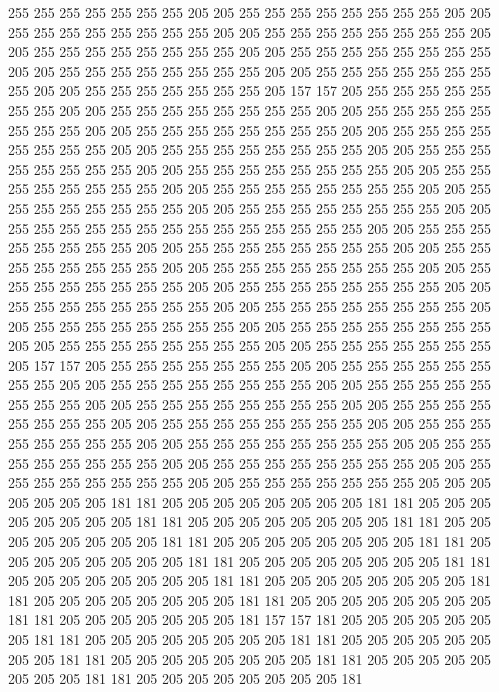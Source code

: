 255 255 255 255 255 255 255 205 205 255 255 255 255 255 255 255 255 205 205 255
255 255 255 255 255 255 255 205 205 255 255 255 255 255 255 255 255 205 205 255
255 255 255 255 255 255 255 205 205 255 255 255 255 255 255 255 255 205 205 255
255 255 255 255 255 255 255 205 205 255 255 255 255 255 255 255 255 205 205 255
255 255 255 255 255 255 205 157 157 205 255 255 255 255 255 255 255 205 205 255
255 255 255 255 255 255 255 205 205 255 255 255 255 255 255 255 255 205 205 255
255 255 255 255 255 255 255 205 205 255 255 255 255 255 255 255 255 205 205 255
255 255 255 255 255 255 255 205 205 255 255 255 255 255 255 255 255 205 205 255
255 255 255 255 255 255 255 205 205 255 255 255 255 255 255 255 255 205 205 255
255 255 255 255 255 255 255 205 205 255 255 255 255 255 255 255 255 205 205 255
255 255 255 255 255 255 255 205 205 255 255 255 255 255 255 255 255 255 255 255
255 255 255 205 205 255 255 255 255 255 255 255 255 205 205 255 255 255 255 255
255 255 255 205 205 255 255 255 255 255 255 255 255 205 205 255 255 255 255 255
255 255 255 205 205 255 255 255 255 255 255 255 255 205 205 255 255 255 255 255
255 255 255 205 205 255 255 255 255 255 255 255 255 205 205 255 255 255 255 255
255 255 255 205 205 255 255 255 255 255 255 255 255 205 205 255 255 255 255 255
255 255 255 205 205 255 255 255 255 255 255 255 255 205 205 255 255 255 255 255
255 255 205 157 157 205 255 255 255 255 255 255 255 205 205 255 255 255 255 255
255 255 255 205 205 255 255 255 255 255 255 255 255 205 205 255 255 255 255 255
255 255 255 205 205 255 255 255 255 255 255 255 255 205 205 255 255 255 255 255
255 255 255 205 205 255 255 255 255 255 255 255 255 205 205 255 255 255 255 255
255 255 255 205 205 255 255 255 255 255 255 255 255 205 205 255 255 255 255 255
255 255 255 205 205 255 255 255 255 255 255 255 255 205 205 255 255 255 255 255
255 255 255 205 205 255 255 255 255 255 255 255 205 205 205 205 205 205 205 181
181 205 205 205 205 205 205 205 205 181 181 205 205 205 205 205 205 205 205 181
181 205 205 205 205 205 205 205 205 181 181 205 205 205 205 205 205 205 205 181
181 205 205 205 205 205 205 205 205 181 181 205 205 205 205 205 205 205 205 181
181 205 205 205 205 205 205 205 205 181 181 205 205 205 205 205 205 205 205 181
181 205 205 205 205 205 205 205 205 181 181 205 205 205 205 205 205 205 205 181
181 205 205 205 205 205 205 205 205 181 181 205 205 205 205 205 205 205 181 157
157 181 205 205 205 205 205 205 205 181 181 205 205 205 205 205 205 205 205 181
181 205 205 205 205 205 205 205 205 181 181 205 205 205 205 205 205 205 205 181
181 205 205 205 205 205 205 205 205 181 181 205 205 205 205 205 205 205 205 181
